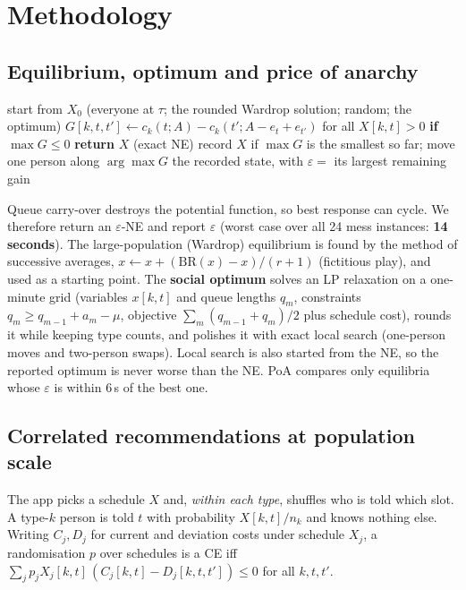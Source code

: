 \documentclass{article}
\begin{document}
\section{Methodology}
\subsection{Equilibrium, optimum and price of anarchy}
\begin{algorithm}[H]\small
\caption{Best-response dynamics returning an (\(\varepsilon\)-)Nash equilibrium (\texttt{game.nash\_equilibrium})}\label{alg:br}
\begin{algorithmic}[1]
\State start from $X_0$ (everyone at $\tau$; the rounded Wardrop solution; random; the optimum)
\Repeat
\State $G[k,t,t'] \gets c_k(t;A)-c_k(t';A-e_t+e_{t'})$ for all $X[k,t]>0$ 
\State \textbf{if} $\max G\le 0$ \textbf{return} $X$ (exact NE)
\State record $X$ if $\max G$ is the smallest so far; move one person along $\arg\max G$
\State \Return the recorded state, with $\varepsilon=$ its largest remaining gain
\end{algorithmic}\end{algorithm}

Queue carry-over destroys the potential function, so best response can cycle. We therefore return an
$\varepsilon$-NE and report $\varepsilon$ (worst case over all 24 mess instances: \textbf{14 seconds}). The large-population
(Wardrop) equilibrium is found by the method of successive averages, $x\leftarrow x+(\mathrm{BR}(x)-x)/(r+1)$
(fictitious play), and used as a starting point. The \textbf{social optimum} solves an LP relaxation on a one-minute
grid (variables $x[k,t]$ and queue lengths $q_m$, constraints $q_m\ge q_{m-1}+a_m-\mu$, objective
$\sum_m (q_{m-1}+q_m)/2$ plus schedule cost), rounds it while keeping type counts, and polishes it with exact local
search (one-person moves and two-person swaps). Local search is also started from the NE, so the reported optimum
is never worse than the NE. PoA compares only equilibria whose $\varepsilon$ is within 6\,s of the best one.

\subsection{Correlated recommendations at population scale}
The app picks a schedule $X$ and, \emph{within each type}, shuffles who is told which slot. A type-$k$ person is told
$t$ with probability $X[k,t]/n_k$ and knows nothing else. Writing $C_j,D_j$ for current and deviation costs under
schedule $X_j$, a randomisation $p$ over schedules is a CE iff
$\sum_j p_j X_j[k,t]\,(C_j[k,t]-D_j[k,t,t'])\le 0$ for all $k,t,t'$.
\end{document}
